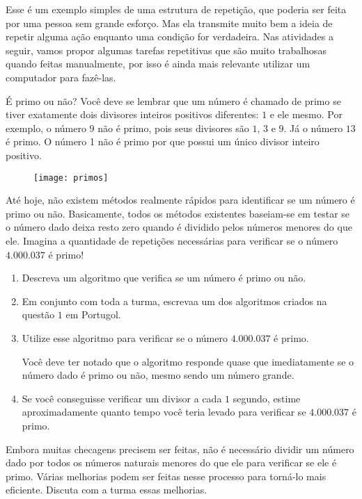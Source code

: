Esse é um exemplo simples de uma estrutura de repetição, que poderia ser feita por uma pessoa sem grande esforço. Mas ela transmite muito bem a ideia de repetir alguma ação enquanto uma condição for verdadeira. Nas atividades a seguir, vamos propor algumas tarefas repetitivas que são muito trabalhosas quando feitas manualmente, por isso é ainda mais relevante utilizar um computador para fazê-las.

\begin{task}{É primo ou não?}
Você deve se lembrar que um número é chamado de primo se tiver exatamente dois divisores inteiros positivos diferentes: $1$ e ele mesmo. Por exemplo, o número $9$ não é primo, pois seus divisores são $1$, $3$ e $9$. Já o número $13$ é primo. O número 1 não é primo por que possui um único divisor inteiro positivo.

\begin{figure}[H]
\centering

\texttt{[image: primos]}
\end{figure}

Até hoje, não existem métodos realmente rápidos para identificar se um número é primo ou não. Basicamente, todos os métodos existentes baseiam-se em testar se o número dado deixa resto zero quando é dividido pelos números menores do que ele. Imagina a quantidade de repetições necessárias para verificar se o número $4.000.037$ é primo!

\begin{enumerate}
\item Descreva um algoritmo que verifica se um número é primo ou não.

\item Em conjunto com toda a turma, escrevaa um dos algoritmos criados na questão $1$ em Portugol.

\item Utilize esse algoritmo para verificar se o número $4.000.037$ é primo.

Você deve ter notado que o algoritmo responde quase que imediatamente se o número dado é primo ou não, mesmo sendo um número grande.

\item Se você conseguisse verificar um divisor a cada $1$ segundo, estime aproximadamente quanto tempo você teria levado para verificar se $4.000.037$ é primo.
\end{enumerate}

\end{task}

\begin{reflection}
Embora muitas checagens precisem ser feitas, não é necessário dividir um número dado por todos os números naturais menores do que ele para verificar se ele é primo. Várias melhorias podem ser feitas nesse processo para torná-lo mais eficiente. Discuta com a turma essas melhorias.
\end{reflection}

